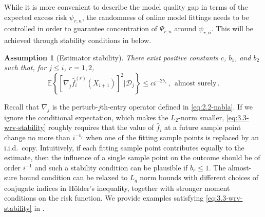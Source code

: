 \documentclass[11pt]{article}
\theoremstyle{plain}
\newtheorem{assumption}[theorem]{Assumption}
\newcommand{\D}{{\mathcal{D}}}
\begin{document}
While it is more convenient to describe the model quality gap in terms of the expected excess risk $\psi_{r,n}$, the randomness of online model fittings needs to be controlled in order to guarantee concentration of $\Psi_{r,n}$ around $\psi_{r,n}$.  This will be achieved through stability conditions in  below.
\begin{assumption}[Estimator stability]\label{asm:3.3-rolling_stability} There exist positive constants $c$, $b_1$, and $b_2$ such that, for $j\le i$, $r=1,2$,
\begin{equation}\label{eq:3.3-wrv-stability}
    \mathbb E\left\{\left[\nabla_j \hat f^{(r)}_i(X_{i+1})\right]^2\bigg|\D_j\right\}\le c i^{-2 b_r}\,,~~\text{almost surely}\,.
\end{equation}
\end{assumption}
Recall that $\nabla_j$ is the perturb-$j$th-entry operator defined in \eqref{eq:2.2-nabla}. If we ignore the conditional expectation, which makes the $L_2$-norm smaller, \eqref{eq:3.3-wrv-stability} roughly requires that the value of $\hat f_i$ at a future sample point change no more than $i^{-b_r}$ when one of the fitting sample points is replaced by an i.i.d.\ copy.  Intuitively, if each fitting sample point contributes equally to the estimate, then the influence of a single sample point on the outcome should be of order $i^{-1}$ and such a stability condition can be plausible if $b_r\le 1$. The almost-sure bound condition can be relaxed to $L_q$ norm bounds with different choices of conjugate indices in H\"{o}lder's inequality, together with stronger moment conditions on the risk function.  We provide examples satisfying \eqref{eq:3.3-wrv-stability} in .
\end{document}
